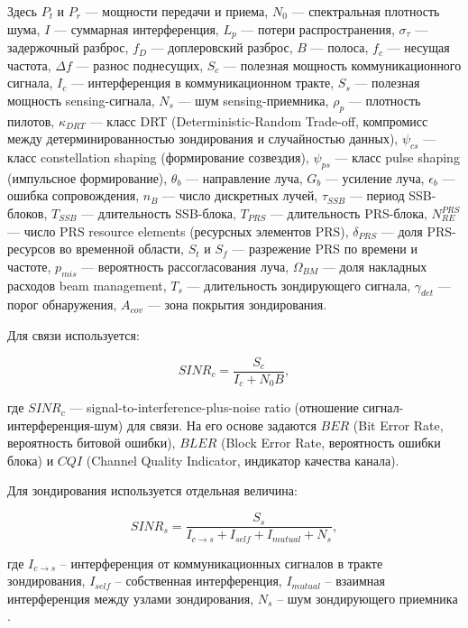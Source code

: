 \documentclass[12pt,a4paper]{article}
\begin{document}
Здесь $P_t$ и $P_r$ --- мощности передачи и приема, $N_0$ --- спектральная плотность шума, $I$ --- суммарная интерференция, $L_p$ --- потери распространения, $\sigma_\tau$ --- задержочный разброс, $f_D$ --- доплеровский разброс, $B$ --- полоса, $f_c$ --- несущая частота, $\Delta f$ --- разнос поднесущих, $S_c$ --- полезная мощность коммуникационного сигнала, $I_c$ --- интерференция в коммуникационном тракте, $S_s$ --- полезная мощность sensing-сигнала, $N_s$ --- шум sensing-приемника, $\rho_p$ --- плотность пилотов, $\kappa_{DRT}$ --- класс DRT (Deterministic-Random Trade-off, компромисс между детерминированностью зондирования и случайностью данных), $\psi_{cs}$ --- класс constellation shaping (формирование созвездия), $\psi_{ps}$ --- класс pulse shaping (импульсное формирование), $\theta_b$ --- направление луча, $G_b$ --- усиление луча, $\epsilon_b$ --- ошибка сопровождения, $n_B$ --- число дискретных лучей, $\tau_{SSB}$ --- период SSB-блоков, $T_{SSB}$ --- длительность SSB-блока, $T_{PRS}$ --- длительность PRS-блока, $N_{RE}^{PRS}$ --- число PRS resource elements (ресурсных элементов PRS), $\delta_{PRS}$ --- доля PRS-ресурсов во временной области, $S_t$ и $S_f$ --- разрежение PRS по времени и частоте, $p_{mis}$ --- вероятность рассогласования луча, $\Omega_{BM}$ --- доля накладных расходов beam management, $T_s$ --- длительность зондирующего сигнала, $\gamma_{det}$ --- порог обнаружения, $A_{cov}$ --- зона покрытия зондирования.

Для связи используется:

\begin{equation}
SINR_c=\frac{S_c}{I_c+N_0B},
\end{equation}

где $SINR_c$ --- signal-to-interference-plus-noise ratio (отношение сигнал-интерференция-шум) для связи. На его основе задаются $BER$ (Bit Error Rate, вероятность битовой ошибки), $BLER$ (Block Error Rate, вероятность ошибки блока) и $CQI$ (Channel Quality Indicator, индикатор качества канала).

Для зондирования используется отдельная величина:

\begin{equation}
SINR_s=
\frac{S_s}
{I_{c\to s}+I_{self}+I_{mutual}+N_s},
\end{equation}

где $I_{c\to s}$ -- интерференция от коммуникационных сигналов в тракте зондирования, $I_{self}$ -- собственная интерференция, $I_{mutual}$ -- взаимная интерференция между узлами зондирования, $N_s$ -- шум зондирующего приемника \cite{liu2026cooperative,liu2024senscap}.
\end{document}
